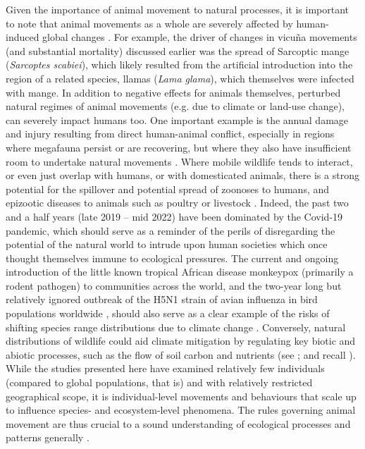 Given the importance of animal movement to natural processes, it is important to note that animal movements as a whole are severely affected by human-induced global changes \parencite{tucker2018}.
For example, the driver of changes in vicu\~na movements (and substantial mortality) discussed earlier \parencite{monk2022} was the spread of Sarcoptic mange (\emph{Sarcoptes scabiei}), which likely resulted from the artificial introduction into the region of a related species, llamas (\emph{Lama glama}), which themselves were infected with mange.
In addition to negative effects for animals themselves, perturbed natural regimes of animal movements (e.g. due to climate or land-use change), can severely impact humans too.
One important example is the annual damage and injury resulting from direct human-animal conflict, especially in regions where megafauna persist or are recovering, but where they also have insufficient room to undertake natural movements \citep{abrahms2021}.
Where mobile wildlife tends to interact, or even just overlap with humans, or with domesticated animals, there is a strong potential for the spillover and potential spread of zoonoses to humans, and epizootic diseases to animals such as poultry or livestock \citep{carlson2022a,wille2022}.
Indeed, the past two and a half years (late 2019 -- mid 2022) have been dominated by the Covid-19 pandemic, which should serve as a reminder of the perils of disregarding the potential of the natural world to intrude upon human societies which once thought themselves immune to ecological pressures.
The current and ongoing introduction of the little known tropical African disease monkeypox (primarily a rodent pathogen) to communities across the world, and the two-year long but relatively ignored outbreak of the H5N1 strain of avian influenza in bird populations worldwide \parencite{wille2022}, should also serve as a clear example of the risks of shifting species range distributions due to climate change \parencite{carlson2022}.
Conversely, natural distributions of wildlife could aid climate mitigation by regulating key biotic and abiotic processes, such as the flow of soil carbon and nutrients (see \cite{schmitz2018,malhi2022}; and recall \cite{leroux2018}).
While the studies presented here have examined relatively few individuals (compared to global populations, that is) and with relatively restricted geographical scope, it is individual-level movements and behaviours that scale up to influence species- and ecosystem-level phenomena.
The rules governing animal movement are thus crucial to a sound understanding of ecological processes and patterns generally \citep{jeltsch2013,schlagel2020a,costa-pereira2022}.

